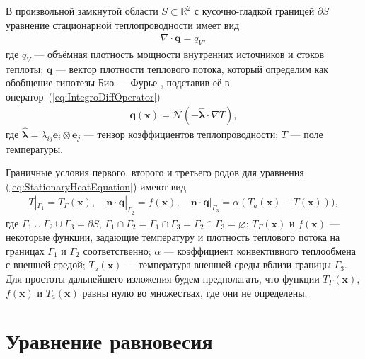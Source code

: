 В произвольной замкнутой области $S \subset \mathbb{R}^2$ с кусочно-гладкой границей $\partial S$ уравнение стационарной теплопроводности имеет вид \cite{MSS}
\begin{gather}
	\label{eq:StationaryHeatEquation}
	\nabla \cdot \boldsymbol{q} = q_V,
\end{gather}
где $q_V$ --- объёмная плотность мощности внутренних источников и стоков теплоты;
$\boldsymbol{q}$ --- вектор плотности теплового потока, который определим как обобщение гипотезы Био --- Фурье \cite{ThermoViscoElasticity1, ThermoViscoElasticity2, ThermoViscoElasticity3}, подставив её в \mbox{оператор~(\ref{eq:IntegroDiffOperator})}
\begin{gather}
	\label{eq:BiotFourier}
	\boldsymbol{q}(\boldsymbol{x}) = 
	\mathcal{N} \left( -\widehat{\boldsymbol{\lambda}} \cdot \nabla T \right),
\end{gather}
где $\widehat{\boldsymbol{\lambda}} = \lambda_{ij} \boldsymbol{e}_i \otimes \boldsymbol{e}_j$ --- тензор коэффициентов теплопроводности;
$T$ --- поле температуры.

Граничные условия первого, второго и третьего родов для уравнения (\ref{eq:StationaryHeatEquation}) имеют вид
\begin{gather}
	\label{eq:ThermalBoundaries}
	T|_{\Gamma_1} = T_{\Gamma} (\boldsymbol{x}),
	\quad
	\boldsymbol{n} \cdot \boldsymbol{q}|_{\Gamma_2} = f(\boldsymbol{x}),
	\quad
	\boldsymbol{n} \cdot \boldsymbol{q}|_{\Gamma_3} = \alpha (T_a(\boldsymbol{x}) - T(\boldsymbol{x}))),
\end{gather}
где $\Gamma_1 \cup \Gamma_2 \cup \Gamma_3 = \partial S$, $\Gamma_1 \cap \Gamma_2 = \Gamma_1 \cap \Gamma_3 = \Gamma_2 \cap \Gamma_3 = \varnothing$;
$T_{\Gamma} (\boldsymbol{x})$ и $f(\boldsymbol{x})$ --- некоторые функции, задающие температуру и плотность теплового потока на границах $\Gamma_1$ и $\Gamma_2$ соответственно;
$\alpha$ --- коэффициент конвективного теплообмена с внешней средой;
$T_a (\boldsymbol{x})$ --- температура внешней среды вблизи границы $\Gamma_3$.
Для простоты дальнейшего изложения будем предполагать, что функции $T_{\Gamma}(\boldsymbol{x})$, $f(\boldsymbol{x})$ и $T_a(\boldsymbol{x})$ равны нулю во множествах, где они не определены.

\section{Уравнение равновесия}\label{sec:BasicRelations/EquilibriumEquation}

